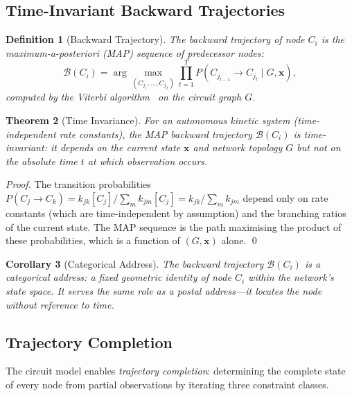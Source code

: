 \documentclass[11pt,twocolumn,a4paper]{article}
\newtheorem{theorem}{Theorem}[section]
\newtheorem{corollary}[theorem]{Corollary}
\newtheorem{definition}[theorem]{Definition}
\newcommand{\Back}{\mathcal{B}}
\begin{document}
\subsection{Time-Invariant Backward Trajectories}

\begin{definition}[Backward Trajectory]
\label{def:backward}
The \emph{backward trajectory} of node $C_i$ is the
maximum-a-posteriori (MAP) sequence of predecessor nodes:
\begin{equation}
  \Back(C_i) = \arg\max_{(C_{j_1}, \ldots, C_{j_T})}
  \prod_{t=1}^{T} P(C_{j_{t-1}} \to C_{j_t} \mid G, \mathbf{x}),
  \label{eq:backward}
\end{equation}
computed by the Viterbi algorithm~\citep{viterbi1967,rabiner1989} on
the circuit graph $G$.
\end{definition}

\begin{theorem}[Time Invariance]
\label{thm:time-invariance}
For an autonomous kinetic system (time-independent rate constants),
the MAP backward trajectory $\Back(C_i)$ is time-invariant: it
depends on the current state $\mathbf{x}$ and network topology $G$
but not on the absolute time $t$ at which observation occurs.
\end{theorem}

\begin{proof}
The transition probabilities
$P(C_j \to C_k) = k_{jk}[C_j] / \sum_m k_{jm}[C_j]
= k_{jk} / \sum_m k_{jm}$ depend only on rate constants (which are
time-independent by assumption) and the branching ratios of the
current state.  The MAP sequence is the path maximising the product
of these probabilities, which is a function of $(G, \mathbf{x})$
alone.  \qed
\end{proof}

\begin{corollary}[Categorical Address]
\label{cor:categorical-address}
The backward trajectory $\Back(C_i)$ is a \emph{categorical address}:
a fixed geometric identity of node $C_i$ within the network's state
space.  It serves the same role as a postal address---it locates the
node without reference to time.
\end{corollary}

\subsection{Trajectory Completion}

The circuit model enables \emph{trajectory completion}: determining
the complete state of every node from partial observations by
iterating three constraint classes.
\end{document}
